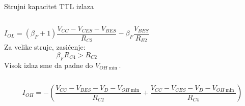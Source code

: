 \begin{frame}[label=10-s061]{Strujni kapacitet TTL izlaza}
\setlength{\abovedisplayskip}{4pt}\setlength{\belowdisplayskip}{4pt}\setlength{\abovedisplayshortskip}{3pt}\setlength{\belowdisplayshortskip}{3pt}
\begin{columns}[T,onlytextwidth]\centering \raggedright
\[I_{OL}=(\beta_F+1)\frac{V_{CC}-V_{CES}-V_{BES}}{R_{C2}}-\beta_F\frac{V_{BES}}{R_{E2}}\]
Za velike struje, zasićenje:
\[\beta_FR_{C4}>R_{C2}\]
Visok izlaz sme da padne do $V_{OH\min}$.\end{columns}\medskip
\[I_{OH}=-\left(\frac{V_{CC}-V_{BES}-V_D-V_{OH\min}}{R_{C2}}+\frac{V_{CC}-V_{CES}-V_D-V_{OH\min}}{R_{C4}}\right)\]
\end{frame}

